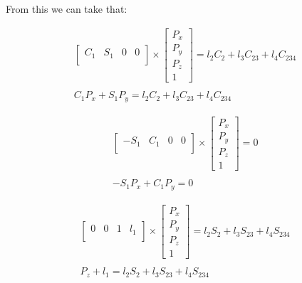 \documentclass[transmag]{IEEEtran}
\begin{document}
From this we can take that:

\begin{equation}
\begin{matrix}
\begin{bmatrix}
C_1  & S_1   & 0 & 0   \\
\end{bmatrix}
\times
\begin{bmatrix}
P_x \\
P_y \\
P_z \\
1
\end{bmatrix}
= l_2 C_2 + l_3 C_{23} + l_4 C_{234} \\
\\
C_1 P_x + S_1 P_y = l_2 C_2 + l_3 C_{23} + l_4 C_{234}
\end{matrix}
\end{equation}

\begin{equation}
\begin{matrix}
\begin{bmatrix}
-S_1  & C_1   & 0 & 0   \\
\end{bmatrix}
\times
\begin{bmatrix}
P_x \\
P_y \\
P_z \\
1
\end{bmatrix}
= 0 \\
\\
-S_1 P_x + C_1 P_y = 0
\end{matrix}
\end{equation}

\begin{equation}
\begin{matrix}
\begin{bmatrix}
0  & 0   & 1 & l_1   \\
\end{bmatrix}
\times
\begin{bmatrix}
P_x \\
P_y \\
P_z \\
1
\end{bmatrix}
= l_2 S_2 + l_3 S_{23} + l_4 S_{234} \\
\\
P_z + l_1 = l_2 S_2 + l_3 S_{23} + l_4 S_{234}
\end{matrix}
\end{equation}
\end{document}
